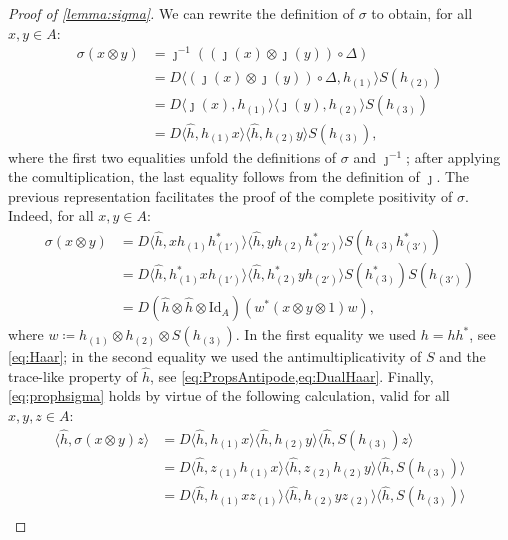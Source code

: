 \documentclass[a4paper,10pt]{amsart}
\newcommand{\eval}[2]{\langle #1 , #2\rangle}
\theoremstyle{definition}
\begin{document}
\begin{proof}[Proof of \cref{lemma:sigma}]
We can rewrite the definition of $\sigma$ to obtain, for all $x,y\in A$:
\begin{align*}
    \sigma(x \otimes y)
      & =
    \jmath^{-1}( (\jmath(x)\otimes\jmath(y)) \circ \Delta )
    \\ &
    =
    D \eval{ (\jmath(x)\otimes \jmath(y)) \circ \Delta }{ h_{(1)} } S(h_{(2)})
    \\ &
    =
    D \eval{\jmath(x)}{ h_{(1)}}
        \eval{ \jmath(y) }{ h_{(2)}} S(h_{(3)})
    \\ &
    =
    D \eval{\hat{h}}{h_{(1)} x}
        \eval{\hat{h}}{h_{(2)} y} S(h_{(3)}),
\end{align*}
where the first two equalities unfold the definitions of $\sigma$ and $\jmath^{-1}$; after applying the comultiplication, the last equality follows from the definition of $\jmath$.
\smallbreak\noindent%
The previous representation facilitates the proof of the complete positivity of $\sigma$. Indeed, for all $x,y\in A$:
\begin{align*}
    \sigma(x \otimes y)
      & =
    D \eval{\hat{h}}{x h_{(1)} h_{(1')}^*}
        \eval{\hat{h}}{y h_{(2)} h_{(2')}^*}
            S(h_{(3)} h_{(3')}^*)
    \\ &
    =
    D \eval{\hat{h}}{h_{(1)}^* x h_{(1')}}
        \eval{\hat{h}}{h_{(2)}^* y h_{(2')}}
            S(h_{(3)}^*) S(h_{(3')})
    \\ &
    =
    D (\hat{h}\otimes \hat{h} \otimes \mathrm{Id}_A)
            (w^* (x\otimes y\otimes 1) w),
\end{align*}
where $w \coloneqq h_{(1)}\otimes h_{(2)}\otimes S(h_{(3)})$. In the first equality we used $h=hh^*$, see \cref{eq:Haar}; in the second equality we used the antimultiplicativity of $S$ and the trace-like property of $\hat{h}$, see \cref{eq:PropsAntipode,eq:DualHaar}.
\smallbreak\noindent%
Finally, \cref{eq:prophsigma} holds by virtue of the following calculation, valid for all $x,y,z\in A$:
\begin{align*}
    \eval{\hat{h}}{\sigma(x\otimes y)z}
      & =
    D \eval{\hat{h}}{h_{(1)} x}
    \eval{\hat{h}}{h_{(2)} y}
    \eval{\hat{h}}{S(h_{(3)})z}
    \\ &
    =
    D \eval{\hat{h}}{z_{(1)} h_{(1)} x}
    \eval{\hat{h}}{z_{(2)} h_{(2)} y}
    \eval{\hat{h}}{S(h_{(3)})}
    \\ &
    =
    D \eval{\hat{h}}{h_{(1)} x z_{(1)}}
    \eval{\hat{h}}{h_{(2)} y z_{(2)}}
    \eval{\hat{h}}{S(h_{(3)})}
    \\ &

\end{align*}
\end{proof}
\end{document}

